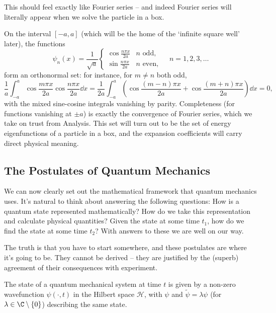 This should feel exactly like Fourier series -- and indeed Fourier series will literally appear when we solve the particle in a box.

\begin{example}
    On the interval $[-a, a]$ (which will be the home of the `infinite square well' later), the functions
    $$
    \psi_n(x) = \frac{1}{\sqrt{a}} \begin{cases} \cos \frac{n \pi x}{2a} & n \text{ odd}, \\[2pt] \sin \frac{n \pi x}{2a} & n \text{ even}, \end{cases} \quad n = 1, 2, 3, \dots
    $$
    form an orthonormal set: for instance, for $m \neq n$ both odd,
    $$
    \frac{1}{a}\int_{-a}^{a} \cos \frac{m \pi x}{2a} \cos \frac{n \pi x}{2a} \dd x = \frac{1}{2a} \int_{-a}^a \left( \cos \frac{(m-n)\pi x}{2a} + \cos\frac{(m+n)\pi x}{2a} \right) \dd x = 0,
    $$
    with the mixed sine-cosine integrals vanishing by parity. Completeness (for functions vanishing at $\pm a$) is exactly the convergence of Fourier series, which we take on trust from Analysis. This set will turn out to be the set of energy eigenfunctions of a particle in a box, and the expansion coefficients will carry direct physical meaning.
\end{example}

\subsection{The Postulates of Quantum Mechanics}

We can now clearly set out the mathematical framework that quantum mechanics uses. It's natural to think about answering the following questions: How is a quantum state represented mathematically? How do we take this representation and calculate physical quantities? Given the state at some time $t_1$, how do we find the state at some time $t_2$? With answers to these we are well on our way.

The truth is that you have to start somewhere, and these postulates are where it's going to be. They cannot be derived -- they are justified by the (superb) agreement of their consequences with experiment.

\begin{axiom}[States]
    The state of a quantum mechanical system at time $t$ is given by a non-zero wavefunction $\psi(\cdot, t)$ in the Hilbert space $\mathcal{H}$, with $\psi$ and $\tilde\psi = \lambda \psi$ (for $\lambda \in \C \setminus \{0\}$) describing the same state.
\end{axiom}

